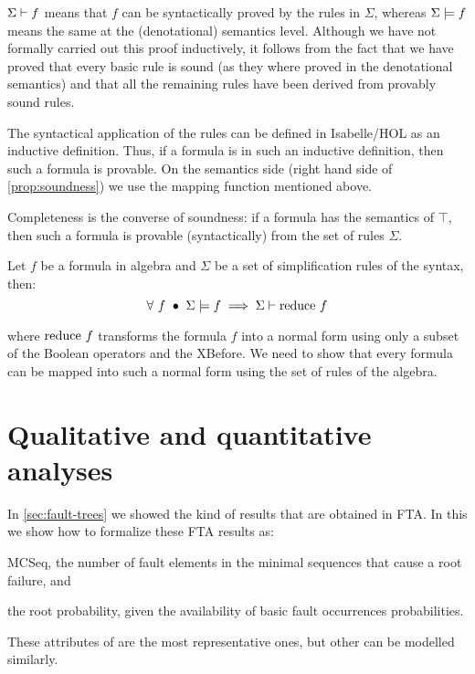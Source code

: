 $\Sigma\vdash{f}$ means that $f$ can be syntactically proved by the rules in $\Sigma$, whereas $\Sigma\models{f}$ means the same at the (denotational) semantics level.
Although we have not formally carried out this proof inductively, it follows from the fact that we have proved that every basic rule is sound (as they where proved in the denotational semantics) and that all the remaining rules have been derived from provably sound rules. 

The syntactical application of the rules can be defined in Isabelle/HOL as an inductive definition.
Thus, if a formula is in such an inductive definition, then such a formula is provable.
On the semantics side (right hand side of \ref{prop:soundness}) we use the mapping function mentioned above.

Completeness is the converse of soundness:
if a formula has the semantics of $\top$, then such a formula is provable (syntactically) from the set of rules $\Sigma$.

\begin{proposition}[Completeness]
Let $f$ be a formula in \ac{algebra} and $\Sigma$ be a set of simplification rules of the syntax, then:
%
\begin{equation}
\forall~ f ~\bullet~ \Sigma\models{f} \implies \Sigma\vdash{\ensuremath{\mathrm{reduce}~f}}\label{prop:completeness}
\end{equation}
%
\end{proposition}
%
\noindent where $\mathrm{reduce}~f$ transforms the formula $f$ into a normal form using only a subset of the Boolean operators and the \ac{XBefore}.
We need to show that every formula can be mapped into such a normal form using the set of rules of the \ac{algebra}.

\section{Qualitative and quantitative analyses}
\label{sec:qualitative-quantitative-analyses}

In \cref{sec:fault-trees} we showed the kind of results that are obtained in \ac{FTA}.
In this  we show how to formalize these \ac{FTA} results as: 
\begin{alineasinline}
  \item \ac{MCSeq}, the number of fault elements in the minimal sequences that cause a root failure, and 
  \item the root probability, given the availability of basic fault occurrences probabilities.
\end{alineasinline}
%
These attributes of  are the most representative ones, but other can be modelled similarly.

